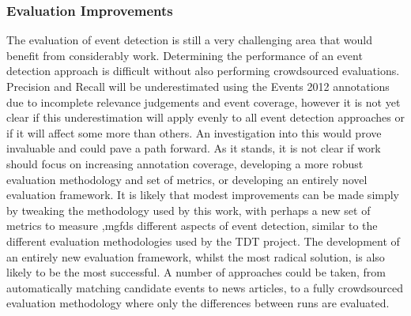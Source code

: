 \subsubsection{Evaluation Improvements}
The evaluation of event detection is still a very challenging area that would benefit from considerably work.
Determining the performance of an event detection approach is difficult without also performing crowdsourced evaluations.
Precision and Recall will be underestimated using the Events 2012 annotations due to incomplete relevance judgements and event coverage, however it is not yet clear if this underestimation will apply evenly to all event detection approaches or if it will affect some more than others.
An investigation into this would prove invaluable  and could pave a path forward.
As it stands, it is not clear if work should focus on increasing annotation coverage, developing a more robust evaluation methodology and set of metrics, or developing an entirely novel evaluation framework.
It is likely that modest improvements can be made simply by tweaking the methodology used by this work, with perhaps a new set of metrics to measure ,mgfds	 different aspects of event detection, similar to the different evaluation methodologies used by the TDT project.
The development of an entirely new evaluation framework, whilst the most radical solution, is also likely to be the most successful.
A number of approaches could be taken, from automatically matching candidate events to news articles, to a fully crowdsourced evaluation methodology where only the differences between runs are evaluated.

